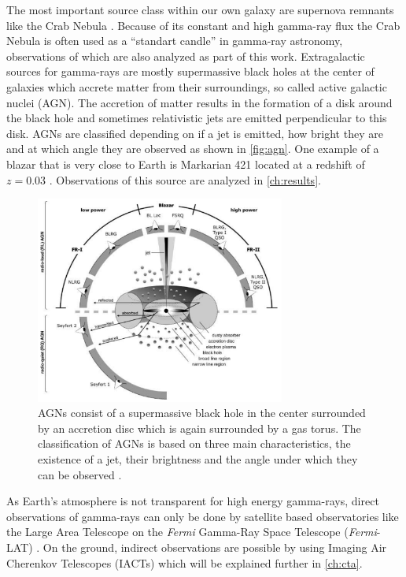 The most important source class within our own galaxy are supernova remnants like the Crab Nebula \cite{nuimeprn12618}. 
Because of its constant and high gamma-ray flux the Crab Nebula is often used as a \enquote{standart candle} in gamma-ray astronomy, observations of which are also 
analyzed as part of this work.
Extragalactic sources for gamma-rays are mostly supermassive black holes at the center of galaxies which accrete matter from their surroundings,
so called active galactic nuclei (AGN).
The accretion of matter results in the formation of a disk around the black hole and sometimes relativistic jets are emitted perpendicular to this disk.
AGNs are classified depending on if a jet is emitted, how bright they are and at which angle they are observed as shown in \autoref{fig:agn}.
One example of a blazar that is very close to Earth is Markarian 421 located at a redshift of $z = \num{0.03}$ \cite{Albert_2007}.
Observations of this source are analyzed in \autoref{ch:results}.
\begin{figure}
    \centering
    \includegraphics[width=0.73\textwidth]{images/agn.png}
    \caption{AGNs consist of a supermassive black hole in the center surrounded by an accretion disc which is again surrounded by a gas torus.
        The classification of AGNs is based on three main characteristics, the existence of a jet, their brightness and the angle under which they can be observed \cite{doi:10.1002/9783527666829.ch4}.
    }
    \label{fig:agn}
\end{figure}

As Earth's atmosphere is not transparent for high energy gamma-rays, direct observations of gamma-rays can only be done by satellite based observatories 
like the Large Area Telescope on the \textit{Fermi} Gamma-Ray Space Telescope (\textit{Fermi}-LAT) \cite{Atwood_2009}.
On the ground, indirect observations are possible by using Imaging Air Cherenkov Telescopes (IACTs) which will be explained further in \autoref{ch:cta}.
